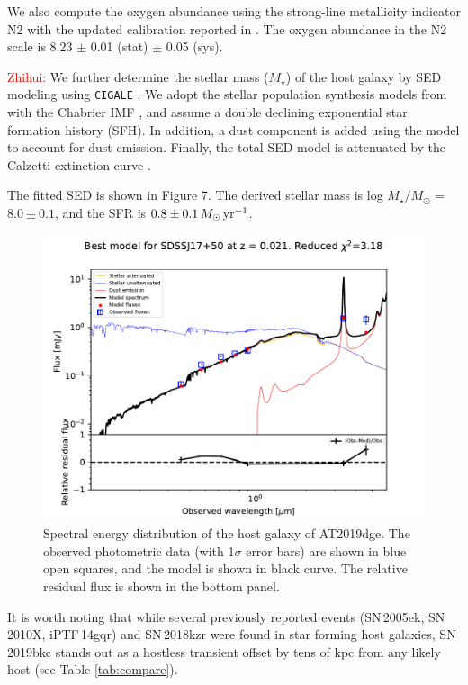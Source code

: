 \documentclass[twocolumn]{aastex63}
\begin{document}
\begin{CJK*}{UTF8}{gbsn}
We also compute the oxygen abundance using the strong-line metallicity indicator N2 
\citep{Pettini2004} with the updated calibration reported in \citet{Marino2013}. The oxygen abundance 
in the N2 scale is 8.23 $\pm$ 0.01 (stat) $\pm$ 0.05 (sys).

\textcolor{red}{Zhihui:} 
We further determine the stellar mass ($M_{\star}$) of the host galaxy by SED modeling using 
\texttt{CIGALE} \citep{CIGALE19}. We adopt the stellar population synthesis models from \citet{BC03} 
with the Chabrier IMF \citep{Chabrier2003}, and assume a double declining  exponential star formation 
history (SFH). In addition, a dust component is added using the \citet{DL07} model to account for dust 
emission. Finally, the total SED model is attenuated by the Calzetti extinction curve \citep{Calzetti2000}.

The fitted SED is shown in Figure 7. The derived stellar mass is log $M_{\star}/M_{\odot}$ = 
$8.0 \pm 0.1$, and the SFR is $0.8 \pm0.1\, M_\odot\, {\rm yr^{-1}}$.

\begin{figure}[htbp!]
	\centering
	\includegraphics[width=1.2\columnwidth]{figures/SDSSJ17+50_best_model.pdf}
	\caption{Spectral energy distribution of the host galaxy of AT2019dge. The observed photometric 
	data (with 1$\sigma$ error bars) are shown in blue open squares, and the model is shown in black 
	curve. The relative residual flux is shown in the bottom panel.
		\label{fig:SEDfit}}
\end{figure}

It is worth noting that while several 
previously reported events (SN\,2005ek, SN\,2010X, iPTF\,14gqr) and SN\,2018kzr were found in star 
forming host galaxies, SN\,2019bkc stands out as a hostless transient offset by tens of kpc from any 
likely host (see Table \ref{tab:compare}). 



\end{CJK*}
\end{document}
